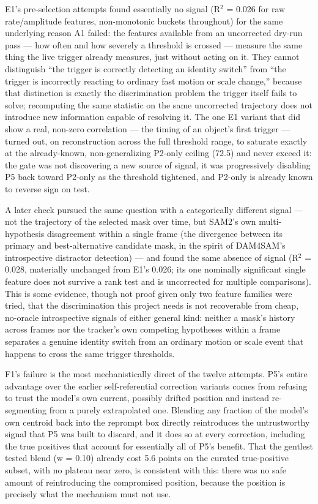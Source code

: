 \documentclass[11pt]{article}
\begin{document}
E1's pre-selection attempts found essentially no signal (R$^2$ = 0.026 for raw rate/amplitude features, non-monotonic buckets throughout) for the same underlying reason A1 failed: the features available from an uncorrected dry-run pass — how often and how severely a threshold is crossed — measure the same thing the live trigger already measures, just without acting on it. They cannot distinguish ``the trigger is correctly detecting an identity switch'' from ``the trigger is incorrectly reacting to ordinary fast motion or scale change,'' because that distinction is exactly the discrimination problem the trigger itself fails to solve; recomputing the same statistic on the same uncorrected trajectory does not introduce new information capable of resolving it. The one E1 variant that did show a real, non-zero correlation — the timing of an object's first trigger — turned out, on reconstruction across the full threshold range, to saturate exactly at the already-known, non-generalizing P2-only ceiling (72.5) and never exceed it: the gate was not discovering a new source of signal, it was progressively disabling P5 back toward P2-only as the threshold tightened, and P2-only is already known to reverse sign on test.

A later check pursued the same question with a categorically different signal — not the trajectory of the selected mask over time, but SAM2's own multi-hypothesis disagreement within a single frame (the divergence between its primary and best-alternative candidate mask, in the spirit of DAM4SAM's introspective distractor detection) — and found the same absence of signal (R$^2$ = 0.028, materially unchanged from E1's 0.026; its one nominally significant single feature does not survive a rank test and is uncorrected for multiple comparisons). This is some evidence, though not proof given only two feature families were tried, that the discrimination this project needs is not recoverable from cheap, no-oracle introspective signals of either general kind: neither a mask's history across frames nor the tracker's own competing hypotheses within a frame separates a genuine identity switch from an ordinary motion or scale event that happens to cross the same trigger thresholds.

F1's failure is the most mechanistically direct of the twelve attempts. P5's entire advantage over the earlier self-referential correction variants comes from refusing to trust the model's own current, possibly drifted position and instead re-segmenting from a purely extrapolated one. Blending any fraction of the model's own centroid back into the reprompt box directly reintroduces the untrustworthy signal that P5 was built to discard, and it does so at every correction, including the true positives that account for essentially all of P5's benefit. That the gentlest tested blend (w = 0.10) already cost 5.6 points on the curated true-positive subset, with no plateau near zero, is consistent with this: there was no safe amount of reintroducing the compromised position, because the position is precisely what the mechanism must not use.
\end{document}
